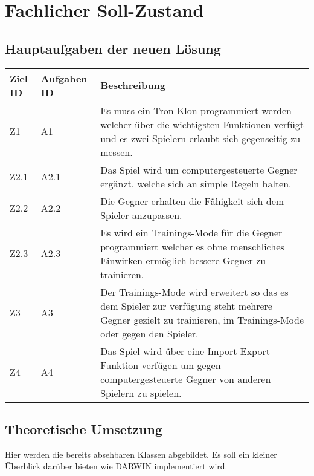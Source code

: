 \usetikzlibrary{arrows,positioning}
\section{Fachlicher Soll-Zustand}


\subsection{Hauptaufgaben der neuen Lösung}

\begin{tabularx}{\textwidth}{| p{0.7cm} | p{1.5cm} | X |}
\hline
\rowcolor[gray]{0.9} Ziel ID & Aufgaben ID & Beschreibung \\
\hline
Z1 & A1 & Es muss ein Tron-Klon programmiert werden welcher über die wichtigsten Funktionen verfügt und es zwei Spielern erlaubt sich gegenseitig zu messen.\\
\hline
Z2.1 & A2.1 & Das Spiel wird um computergesteuerte Gegner ergänzt, welche sich an simple Regeln halten. \\
\hline
Z2.2 & A2.2 & Die Gegner erhalten die Fähigkeit sich dem Spieler anzupassen. \\
\hline 
Z2.3 & A2.3 & Es wird ein Trainings-Mode für die Gegner programmiert welcher es ohne menschliches Einwirken ermöglich bessere Gegner zu trainieren. \\
\hline
Z3 & A3 & Der Trainings-Mode wird erweitert so das es dem Spieler zur verfügung steht mehrere Gegner gezielt zu trainieren, im Trainings-Mode oder gegen den Spieler. \\
\hline
Z4 & A4 & Das Spiel wird über eine Import-Export Funktion verfügen um gegen computergesteuerte Gegner von anderen Spielern zu spielen. \\
\hline
\end{tabularx}

\subsection{Theoretische Umsetzung}

Hier werden die bereits absehbaren Klassen abgebildet. Es soll ein kleiner Überblick darüber bieten wie DARWIN implementiert wird. 
\\
	\medskip

